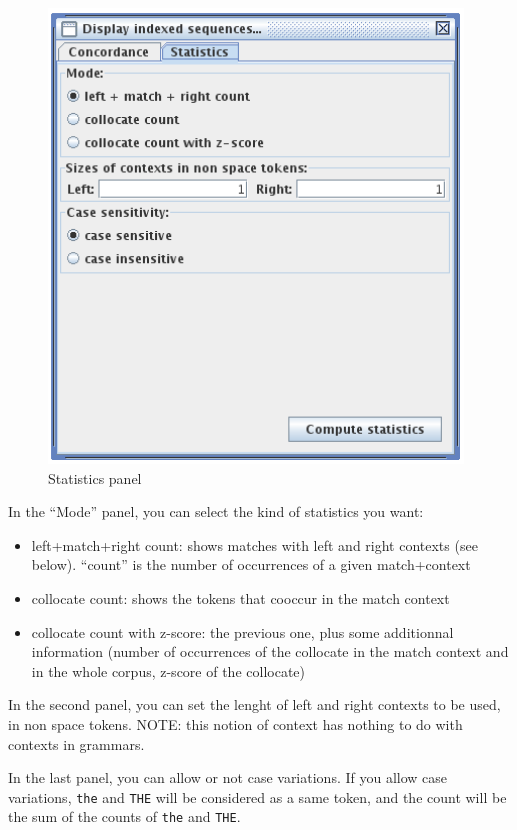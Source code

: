 \bigskip
\begin{figure}[!h]
\begin{center}
\includegraphics[width=11cm]{resources/img/fig4-9.png}
\caption{Statistics panel\label{fig-statistics}}
\end{center}
\end{figure}

\bigskip
\noindent In the ``Mode'' panel, you can select the kind of statistics you want:
\begin{itemize}
  \item left+match+right count: shows matches with left and right contexts (see
  below). ``count'' is the number of occurrences of a given match+context
  \item collocate count: shows the tokens that cooccur in the match context
  \item collocate count with z-score: the previous one, plus some additionnal
  information (number of occurrences of the collocate in the match context and
  in the whole corpus, z-score of the collocate)
\end{itemize}

\bigskip
\noindent In the second panel, you can set the lenght of left and right
contexts to be used, in non space tokens. NOTE: this notion of context has
nothing to do with contexts in grammars.

\bigskip
\noindent In the last panel, you can allow or not case variations. If you allow
case variations, \verb$the$ and \verb$THE$ will be considered as a same token,
and the count will be the sum of the counts of \verb$the$ and \verb$THE$.

